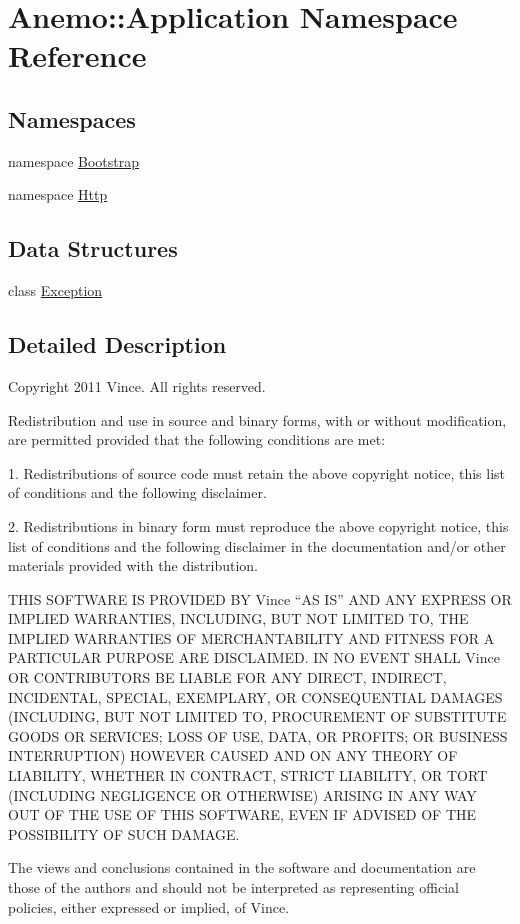 \hypertarget{namespace_anemo_1_1_application}{
\section{Anemo::Application Namespace Reference}
\label{namespace_anemo_1_1_application}
}
\subsection*{Namespaces}
\begin{DoxyCompactItemize}
\item 
namespace \hyperlink{namespace_anemo_1_1_application_1_1_bootstrap}{Bootstrap}
\item 
namespace \hyperlink{namespace_anemo_1_1_application_1_1_http}{Http}
\end{DoxyCompactItemize}
\subsection*{Data Structures}
\begin{DoxyCompactItemize}
\item 
class \hyperlink{class_anemo_1_1_application_1_1_exception}{Exception}
\end{DoxyCompactItemize}


\subsection{Detailed Description}
Copyright 2011 Vince. All rights reserved.

Redistribution and use in source and binary forms, with or without modification, are permitted provided that the following conditions are met:

1. Redistributions of source code must retain the above copyright notice, this list of conditions and the following disclaimer.

2. Redistributions in binary form must reproduce the above copyright notice, this list of conditions and the following disclaimer in the documentation and/or other materials provided with the distribution.

THIS SOFTWARE IS PROVIDED BY Vince ``AS IS'' AND ANY EXPRESS OR IMPLIED WARRANTIES, INCLUDING, BUT NOT LIMITED TO, THE IMPLIED WARRANTIES OF MERCHANTABILITY AND FITNESS FOR A PARTICULAR PURPOSE ARE DISCLAIMED. IN NO EVENT SHALL Vince OR CONTRIBUTORS BE LIABLE FOR ANY DIRECT, INDIRECT, INCIDENTAL, SPECIAL, EXEMPLARY, OR CONSEQUENTIAL DAMAGES (INCLUDING, BUT NOT LIMITED TO, PROCUREMENT OF SUBSTITUTE GOODS OR SERVICES; LOSS OF USE, DATA, OR PROFITS; OR BUSINESS INTERRUPTION) HOWEVER CAUSED AND ON ANY THEORY OF LIABILITY, WHETHER IN CONTRACT, STRICT LIABILITY, OR TORT (INCLUDING NEGLIGENCE OR OTHERWISE) ARISING IN ANY WAY OUT OF THE USE OF THIS SOFTWARE, EVEN IF ADVISED OF THE POSSIBILITY OF SUCH DAMAGE.

The views and conclusions contained in the software and documentation are those of the authors and should not be interpreted as representing official policies, either expressed or implied, of Vince. 